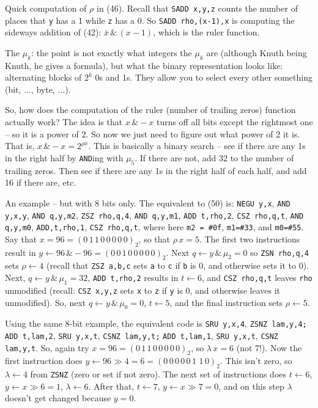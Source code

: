 \vskip 0.08in \noindent [p 141] Quick computation of $\rho$ in (46).
\hfil\break
Recall that {\tt SADD x,y,z} counts the number of places that
{\tt y} has a 1 while {\tt z} has a 0.  So {\tt SADD rho,(x-1),x}
is computing the sideways addition of (42): $\bar x \, \& \, 
\left(x - 1\right)$, which is the ruler function.

\vskip 0.08in \noindent [p 141] The $\mu_k$: the point is not 
exactly what integers the $\mu_k$ are (although Knuth being
Knuth, he gives a formula), but what the binary representation
looks like: alternating blocks of $2^k$ 0s and 1s.  They allow
you to select every other something (bit, $\ldots$, byte, $\ldots$).

\vskip 0.08in \noindent [p 141] So, how does the computation
of the ruler (number of trailing zeros) function actually work?
\hfil\break The idea
is that $x\, \& -x$ turns off all bits except the rightmost one --
so it is a power of 2.  So now we just need to figure
out what power of 2 it is.  That is, $x\, \& -x = 2^{\rho x}$.
This is basically a binary search -- see if there are any 1s
in the right half by {\tt AND}ing with $\mu_5$.  If there are not,
add 32 to the number of trailing zeros.  Then see if there are any
1s in the right half of each half, and add 16 if there are, etc.

An example -- but with 8 bits only.  The equivalent to (50)
is: {\tt NEGU y,x}, {\tt AND y,x,y}, {\tt AND q,y,m2}, {\tt ZSZ rho,q,4},
{\tt AND q,y,m1}, {\tt ADD t,rho,2}, {\tt CSZ rho,q,t},
{\tt AND q,y,m0}, {\tt ADD,t,rho,1}, {\tt CSZ rho,q,t},
where here \hbox{\tt m2 = \#0f}, {\tt m1=\#33}, and {\tt m0=\#55}.
Say that $x = 96 = \left(0\,1\,1\,0\,0\,0\,0\,0\right)_2$,
so that $\rho\,x = 5$.  The first two instructions result in
$y \gets 96\, \& -96 = \left(0\,0\,1\,0\,0\,0\,0\,0\right)_2$.
Next $q \gets y\, \& \,\mu_2 = 0$ so {\tt ZSN rho,q,4} sets $\rho \gets 4$
(recall that {\tt ZSZ a,b,c} sets {\tt a} to {\tt c} if {\tt b} is 0, and
otherwise sets it to 0).  Next, $q \gets y\, \& \,\mu_1 = 32$, {\tt ADD t,rho,2} 
results in $t \gets 6$, and {\tt CSZ rho,q,t} leaves {\tt rho} unmodified
(recall: {\tt CSZ x,y,z} sets {\tt x} to {\tt z} if {\tt y} is 0, and otherwise
leaves it unmodified).  So, next $q \gets y\, \& \, \mu_0 = 0$,
$t \gets 5$, and the final instruction sets $\rho \gets 5$.

\vskip 0.1in 

\noindent [p 142] Using the same 8-bit example, the equivalent
code is {\tt SRU y,x,4}, {\tt ZSNZ lam,y,4;} {\tt ADD t,lam,2},
{\tt SRU y,x,t}, {\tt CSNZ lam,y,t;} {\tt ADD t,lam,1}, {\tt SRU y,x,t},
{\tt CSNZ lam,y,t}. So, again try $x = 96 = 
\left(0\,1\,1\,0\,0\,0\,0\,0\right)_2$, so $\lambda\,x = 6$ (not 7!).  
Now the first instruction
does $y \gets 96 \gg 4 = 6 = \left(0\, 0\, 0\, 0\, 0\, 1\, \,1 \,0\right)_2$.
This isn't zero, so $\lambda \gets 4$ from {\tt ZSNZ} (zero or set
if not zero).  The next set of instructions does $t \gets 6$,
$y \gets x \gg 6 = 1$, $\lambda \gets 6$.  After that, $t \gets 7$,
$y \gets x \gg 7 = 0$, and on this step $\lambda$ doesn't get changed
because $y = 0$.

